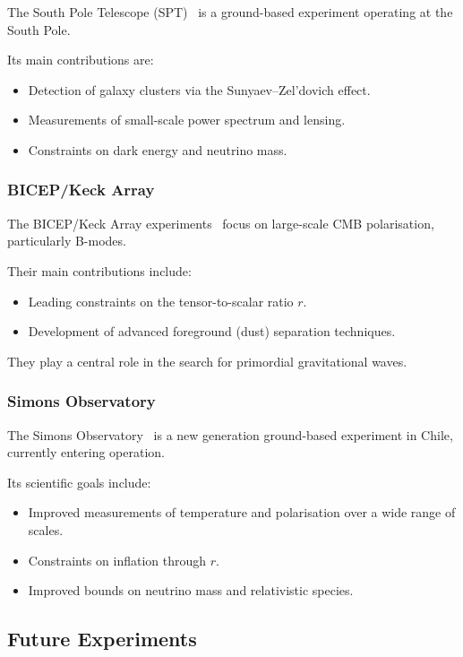\documentclass[../../thesis.tex]{subfiles}
\begin{document}
The South Pole Telescope (SPT)~\cite{SPT2026} is a ground-based experiment operating at the South Pole.

Its main contributions are:
\begin{itemize}
    \item Detection of galaxy clusters via the Sunyaev–Zel'dovich effect.
    \item Measurements of small-scale power spectrum and lensing.
    \item Constraints on dark energy and neutrino mass.
\end{itemize}

\subsubsection{BICEP/Keck Array}

The BICEP/Keck Array experiments~\cite{BICEPKECKXIII} focus on large-scale CMB polarisation, particularly B-modes.

Their main contributions include:
\begin{itemize}
    \item Leading constraints on the tensor-to-scalar ratio $r$.
    \item Development of advanced foreground (dust) separation techniques.
\end{itemize}

They play a central role in the search for primordial gravitational waves.

\subsubsection{Simons Observatory}

The Simons Observatory~\cite{SO2019_Overview} is a new generation ground-based experiment in Chile, currently entering operation.

Its scientific goals include:
\begin{itemize}
    \item Improved measurements of temperature and polarisation over a wide range of scales.
    \item Constraints on inflation through $r$.
    \item Improved bounds on neutrino mass and relativistic species.
\end{itemize}

\subsection{Future Experiments}
\end{document}
